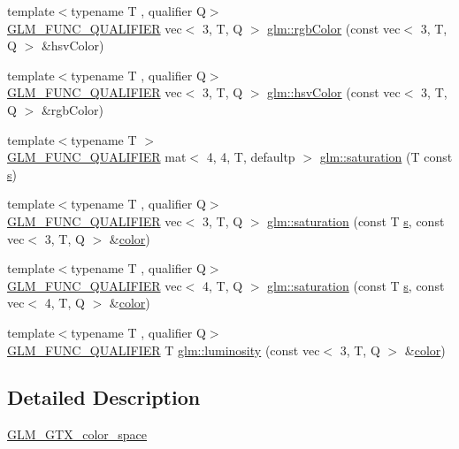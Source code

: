\begin{DoxyCompactItemize}
\item 
{\footnotesize template$<$typename T , qualifier Q$>$ }\\\hyperlink{setup_8hpp_a33fdea6f91c5f834105f7415e2a64407}{G\+L\+M\+\_\+\+F\+U\+N\+C\+\_\+\+Q\+U\+A\+L\+I\+F\+I\+ER} vec$<$ 3, T, Q $>$ \hyperlink{group__gtx__color__space_ga5f9193be46f45f0655c05a0cdca006db}{glm\+::rgb\+Color} (const vec$<$ 3, T, Q $>$ \&hsv\+Color)
\item 
{\footnotesize template$<$typename T , qualifier Q$>$ }\\\hyperlink{setup_8hpp_a33fdea6f91c5f834105f7415e2a64407}{G\+L\+M\+\_\+\+F\+U\+N\+C\+\_\+\+Q\+U\+A\+L\+I\+F\+I\+ER} vec$<$ 3, T, Q $>$ \hyperlink{group__gtx__color__space_ga789802bec2d4fe0f9741c731b4a8a7d8}{glm\+::hsv\+Color} (const vec$<$ 3, T, Q $>$ \&rgb\+Color)
\item 
{\footnotesize template$<$typename T $>$ }\\\hyperlink{setup_8hpp_a33fdea6f91c5f834105f7415e2a64407}{G\+L\+M\+\_\+\+F\+U\+N\+C\+\_\+\+Q\+U\+A\+L\+I\+F\+I\+ER} mat$<$ 4, 4, T, defaultp $>$ \hyperlink{group__gtx__color__space_ga01a97152b44e1550edcac60bd849e884}{glm\+::saturation} (T const \hyperlink{_s_d_l__opengl_8h_a4af680a6c683f88ed67b76f207f2e6e4}{s})
\item 
{\footnotesize template$<$typename T , qualifier Q$>$ }\\\hyperlink{setup_8hpp_a33fdea6f91c5f834105f7415e2a64407}{G\+L\+M\+\_\+\+F\+U\+N\+C\+\_\+\+Q\+U\+A\+L\+I\+F\+I\+ER} vec$<$ 3, T, Q $>$ \hyperlink{group__gtx__color__space_ga2156cea600e90148ece5bc96fd6db43a}{glm\+::saturation} (const T \hyperlink{_s_d_l__opengl_8h_a4af680a6c683f88ed67b76f207f2e6e4}{s}, const vec$<$ 3, T, Q $>$ \&\hyperlink{_s_d_l__opengl__glext_8h_a3ea846f998d64f079b86052b6c4193a8}{color})
\item 
{\footnotesize template$<$typename T , qualifier Q$>$ }\\\hyperlink{setup_8hpp_a33fdea6f91c5f834105f7415e2a64407}{G\+L\+M\+\_\+\+F\+U\+N\+C\+\_\+\+Q\+U\+A\+L\+I\+F\+I\+ER} vec$<$ 4, T, Q $>$ \hyperlink{group__gtx__color__space_gaba0eacee0736dae860e9371cc1ae4785}{glm\+::saturation} (const T \hyperlink{_s_d_l__opengl_8h_a4af680a6c683f88ed67b76f207f2e6e4}{s}, const vec$<$ 4, T, Q $>$ \&\hyperlink{_s_d_l__opengl__glext_8h_a3ea846f998d64f079b86052b6c4193a8}{color})
\item 
{\footnotesize template$<$typename T , qualifier Q$>$ }\\\hyperlink{setup_8hpp_a33fdea6f91c5f834105f7415e2a64407}{G\+L\+M\+\_\+\+F\+U\+N\+C\+\_\+\+Q\+U\+A\+L\+I\+F\+I\+ER} T \hyperlink{group__gtx__color__space_gad028e0a4f1a9c812b39439b746295b34}{glm\+::luminosity} (const vec$<$ 3, T, Q $>$ \&\hyperlink{_s_d_l__opengl__glext_8h_a3ea846f998d64f079b86052b6c4193a8}{color})
\end{DoxyCompactItemize}


\subsection{Detailed Description}
\hyperlink{group__gtx__color__space}{G\+L\+M\+\_\+\+G\+T\+X\+\_\+color\+\_\+space} 